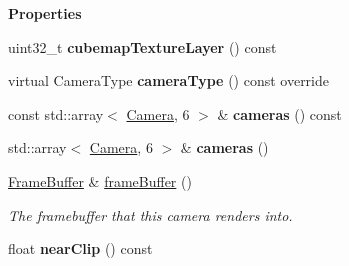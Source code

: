 \begin{Indent}\textbf{ Properties}\par
\begin{DoxyCompactItemize}
\item 
\mbox{\label{classrev_1_1_point_light_camera_ad3476a4d5bea3a7096e6bd63b1241fbd}} 
uint32\+\_\+t {\bfseries cubemap\+Texture\+Layer} () const
\item 
\mbox{\label{classrev_1_1_point_light_camera_a03fa65577125122f61a91aba6356dc73}} 
virtual Camera\+Type {\bfseries camera\+Type} () const override
\item 
\mbox{\label{classrev_1_1_point_light_camera_a3ced79d7773aa041e7bd864a633932b9}} 
const std\+::array$<$ \mbox{\hyperlink{classrev_1_1_camera}{Camera}}, 6 $>$ \& {\bfseries cameras} () const
\item 
\mbox{\label{classrev_1_1_point_light_camera_ad0a687ce8342b376387144085ead2233}} 
std\+::array$<$ \mbox{\hyperlink{classrev_1_1_camera}{Camera}}, 6 $>$ \& {\bfseries cameras} ()
\item 
\mbox{\label{classrev_1_1_point_light_camera_ac88c3528bb3048a5de9426fca201c62a}} 
\mbox{\hyperlink{classrev_1_1_frame_buffer}{Frame\+Buffer}} \& \mbox{\hyperlink{classrev_1_1_point_light_camera_ac88c3528bb3048a5de9426fca201c62a}{frame\+Buffer}} ()
\begin{DoxyCompactList}\small\item\em The framebuffer that this camera renders into. \end{DoxyCompactList}\item 
\mbox{\label{classrev_1_1_point_light_camera_a17a4129d7599f2f47abdac594d67ef1e}} 
float {\bfseries near\+Clip} () const
\end{DoxyCompactItemize}
\end{Indent}
